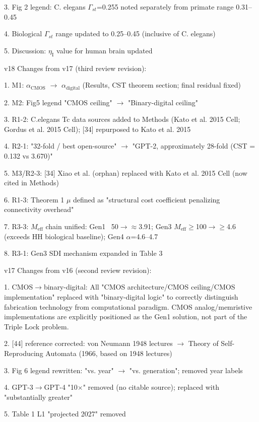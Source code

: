\documentclass[a4paper,12pt]{article}
\begin{document}
3. Fig 2 legend: C. elegans $\Gamma_{st}$=0.255 noted separately from primate range 0.31--0.45

4. Biological $\Gamma_{st}$ range updated to 0.25--0.45 (inclusive of C. elegans)

5. Discussion: $\eta_{\text{I}}$ value for human brain updated

v18 Changes from v17 (third review revision):

1. M1: $\alpha_{\text{CMOS}}$ $\rightarrow$ $\alpha_{\text{digital}}$ (Results, CST theorem section; final residual fixed)

2. M2: Fig5 legend "CMOS ceiling" $\rightarrow$ "Binary-digital ceiling"

3. R1-2: C.elegans Tc data sources added to Methods (Kato et al. 2015 Cell; Gordus et al. 2015 Cell); [34] repurposed to Kato et al. 2015

4. R2-1: "32-fold / best open-source" $\rightarrow$ "GPT-2, approximately 28-fold (CST = 0.132 vs 3.670)"

5. M3/R2-3: [34] Xiao et al. (orphan) replaced with Kato et al. 2015 Cell (now cited in Methods)

6. R1-3: Theorem 1 $\mu$ defined as "structural cost coefficient penalizing connectivity overhead"

7. R3-3: $M_{\text{eff}}$ chain unified: Gen1 ~50$\rightarrow$\alpha$\approx$3.91; Gen3 $M_{\text{eff}}$$\geq$100$\rightarrow$\alpha$\geq$4.6 (exceeds HH biological baseline); Gen4 $\alpha$=4.6--4.7

8. R3-1: Gen3 SDI mechanism expanded in Table 3

v17 Changes from v16 (second review revision):

1. CMOS$\rightarrow$binary-digital: All "CMOS architecture/CMOS ceiling/CMOS implementation" replaced with "binary-digital logic" to correctly distinguish fabrication technology from computational paradigm. CMOS analog/memristive implementations are explicitly positioned as the Gen1 solution, not part of the Triple Lock problem.

2. [44] reference corrected: von Neumann 1948 lectures $\rightarrow$ Theory of Self-Reproducing Automata (1966, based on 1948 lectures)

3. Fig 6 legend rewritten: "vs. year" $\rightarrow$ "vs. generation"; removed year labels

4. GPT-3$\rightarrow$GPT-4 "10$\times$" removed (no citable source); replaced with "substantially greater"

5. Table 1 L1 "projected 2027" removed
\end{document}
